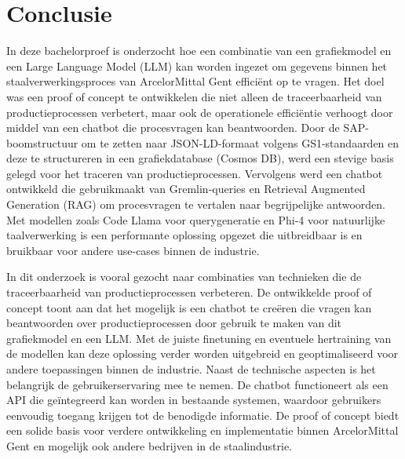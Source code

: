 
\chapter{Conclusie}%
\label{ch:conclusie}
In deze bachelorproef is onderzocht hoe een combinatie van een grafiekmodel en een Large Language Model (LLM) kan worden ingezet om gegevens binnen het staalverwerkingsproces van ArcelorMittal Gent efficiënt op te vragen.
Het doel was een proof of concept te ontwikkelen die niet alleen de traceerbaarheid van productieprocessen verbetert, maar ook de operationele efficiëntie verhoogt door middel van een chatbot die procesvragen kan beantwoorden.
Door de SAP-boomstructuur om te zetten naar JSON-LD-formaat volgens GS1-standaarden en deze te structureren in een grafiekdatabase (Cosmos DB), werd een stevige basis gelegd voor het traceren van productieprocessen.
Vervolgens werd een chatbot ontwikkeld die gebruikmaakt van Gremlin-queries en Retrieval Augmented Generation (RAG) om procesvragen te vertalen naar begrijpelijke antwoorden.
Met modellen zoals Code Llama voor querygeneratie en Phi-4 voor natuurlijke taalverwerking is een performante oplossing opgezet die uitbreidbaar is en bruikbaar voor andere use-cases binnen de industrie.

In dit onderzoek is vooral gezocht naar combinaties van technieken die de traceerbaarheid van productieprocessen verbeteren.
De ontwikkelde proof of concept toont aan dat het mogelijk is een chatbot te creëren die vragen kan beantwoorden over productieprocessen door gebruik te maken van dit grafiekmodel en een LLM.\@
Met de juiste finetuning en eventuele hertraining van de modellen kan deze oplossing verder worden uitgebreid en geoptimaliseerd voor andere toepassingen binnen de industrie.
Naast de technische aspecten is het belangrijk de gebruikerservaring mee te nemen.
De chatbot functioneert als een API die geïntegreerd kan worden in bestaande systemen, waardoor gebruikers eenvoudig toegang krijgen tot de benodigde informatie.
De proof of concept biedt een solide basis voor verdere ontwikkeling en implementatie binnen ArcelorMittal Gent en mogelijk ook andere bedrijven in de staalindustrie.

